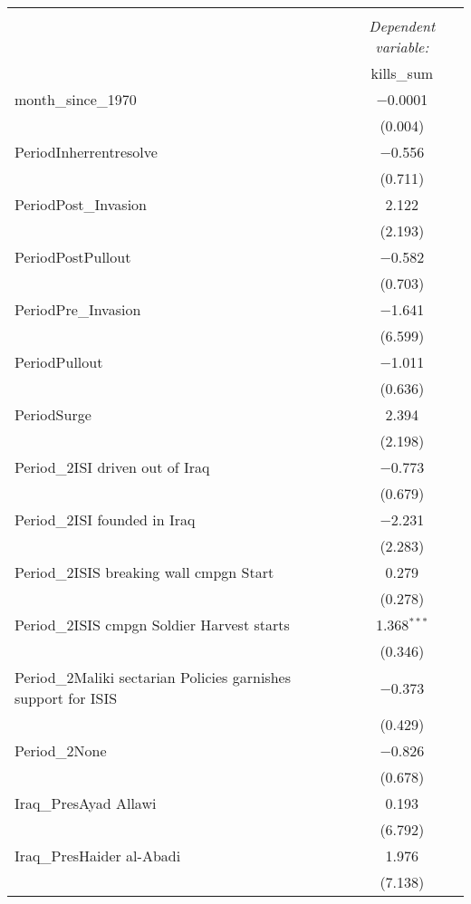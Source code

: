 \begin{table}[ht] \centering 
  \label{tab:quassipoiss} 
\begin{adjustbox}{width=1\textwidth}
\small 
\begin{tabular}{@{\extracolsep{5pt}}lc} 
\\[-1.8ex]\hline 
\hline \\[-1.8ex] 
 & \multicolumn{1}{c}{\textit{Dependent variable:}} \\ 
\cline{2-2} 
& kills\_sum \\ 
\hline  
 month\_since\_1970 & $-$0.0001 \\ 
  & (0.004) \\
 PeriodInherrentresolve & $-$0.556 \\ 
  & (0.711) \\
 PeriodPost\_Invasion & 2.122 \\ 
  & (2.193) \\
 PeriodPostPullout & $-$0.582 \\ 
  & (0.703) \\
 PeriodPre\_Invasion & $-$1.641 \\ 
  & (6.599) \\
 PeriodPullout & $-$1.011 \\ 
  & (0.636) \\
 PeriodSurge & 2.394 \\ 
  & (2.198) \\
 Period\_2ISI driven out of Iraq & $-$0.773 \\ 
  & (0.679) \\
 Period\_2ISI founded in Iraq & $-$2.231 \\ 
  & (2.283) \\
 Period\_2ISIS breaking wall cmpgn Start & 0.279 \\ 
  & (0.278) \\
 Period\_2ISIS cmpgn Soldier Harvest starts & 1.368$^{***}$ \\ 
  & (0.346) \\
 Period\_2Maliki sectarian Policies garnishes support for ISIS & $-$0.373 \\ 
  & (0.429) \\
 Period\_2None & $-$0.826 \\ 
  & (0.678) \\
 Iraq\_PresAyad Allawi & 0.193 \\ 
  & (6.792) \\
 Iraq\_PresHaider al-Abadi & 1.976 \\ 
  & (7.138) \\

\end{tabular}
\end{adjustbox}
\end{table}
